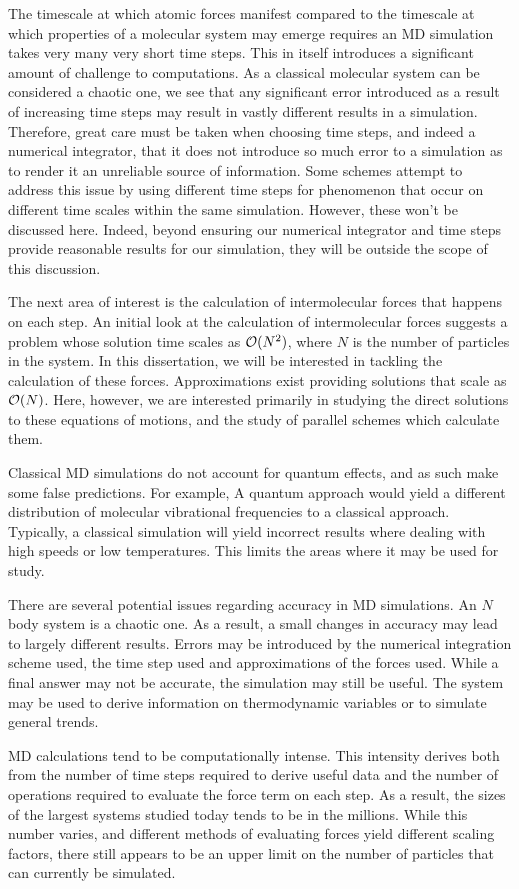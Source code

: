 The timescale at which atomic forces manifest compared to
the timescale at which properties of a molecular system may emerge
requires an MD simulation takes very many very short time steps.
%
This in itself introduces a significant amount of challenge to computations.
%
As a classical molecular system can be considered a chaotic one,
we see that any significant error introduced as a result of
increasing time steps may result in
vastly different results in a simulation.
%
Therefore, great care must be taken when choosing time steps, and
indeed a numerical integrator,
that it does not introduce so much error to a simulation as to render it
an unreliable source of information.
%
Some schemes attempt to address this issue by
using different time steps for phenomenon that occur on
different time scales within the same simulation.
%
However, these won’t be discussed here.
%
Indeed, beyond ensuring our numerical integrator and time steps provide
reasonable results for our simulation,
they will be outside the scope of this discussion.


The next area of interest is
the calculation of intermolecular forces that happens on each step.
%
An initial look at the calculation of intermolecular forces suggests
a problem whose solution time scales as $\mathcal{O}{(N^2)}$,
where $N$ is the number of particles in the system.
%
In this dissertation, we will be interested in
tackling the calculation of these forces.
%
Approximations exist providing solutions that scale as $\mathcal{O}{(N)}$.
%
Here, however, we are interested primarily in
studying the direct solutions to these equations of motions,
and the study of parallel schemes which calculate them.

Classical MD simulations do not account for quantum effects,
and as such make some false predictions.
%
For example, A quantum approach would yield
a different distribution of
molecular vibrational frequencies to a classical approach.
%
Typically, a classical simulation will yield incorrect results
where dealing with high speeds or low temperatures.
%
This limits the areas where it may be used for study.

There are several potential issues regarding accuracy in MD simulations.
%
An $N$ body system is a chaotic one.
%
As a result, a small changes in accuracy may lead to
largely different results.
%
Errors may be introduced by
the numerical integration scheme used,
the time step used and
approximations of the forces used.
%
While a final answer may not be accurate,
the simulation may still be useful.
%
The system may be used to derive information on
thermodynamic variables or to simulate general trends.


MD calculations tend to be computationally intense.
%
This intensity derives both from
the number of time steps required to derive useful data and
the number of operations required to evaluate the force term on each step.
%
As a result, the sizes of the largest systems studied today
tends to be in the millions.
%
While this number varies,
and different methods of evaluating forces yield
different scaling factors,
there still appears to be an upper limit on
the number of particles that can currently be simulated.
